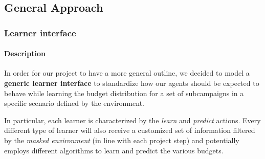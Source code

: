 \documentclass[11pt]{beamer}
\begin{document}

\subsection{General Approach}



\begin{frame}

\frametitle{Learner interface}
\framesubtitle{Description}

In order for our project to have a more general outline, we decided to model a \textbf{generic learner interface} to standardize how our agents should be expected to behave while learning the budget distribution for a set of subcampaigns in a specific scenario defined by the environment.

In particular, each learner is characterized by the \textit{learn} and \textit{predict} actions.
Every different type of learner will also receive a customized set of information filtered by the \textit{masked environment} (in line with each project step) and potentially employs different algorithms to learn and predict the various budgets.

\end{frame}

\end{document}
